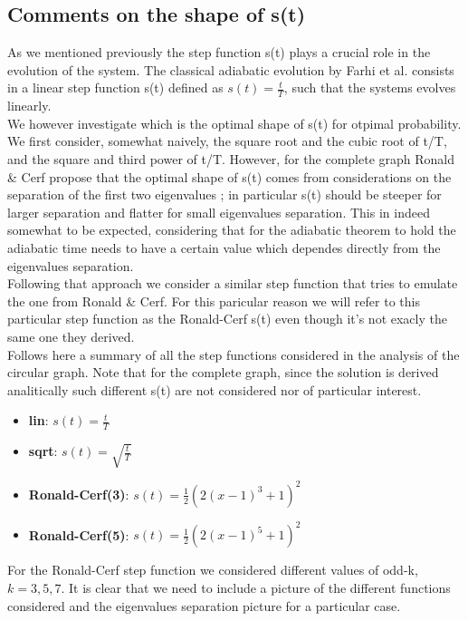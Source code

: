     \subsection{Comments on the shape of s(t)}
        As we mentioned previously the step function s(t) plays a crucial role in the evolution of the system. The classical adiabatic evolution by Farhi et al. \cite{Farhi2000} consists in a linear step function s(t) defined as $s(t) = \frac{t}{T}$, such that the systems evolves linearly. \\


        We however investigate which is the optimal shape of s(t) for otpimal probability. We first consider, somewhat naively, the square root and the cubic root of t/T, and the square and third power of t/T. However, for the complete graph Ronald \& Cerf propose that the optimal shape of s(t) comes from considerations on the separation of the first two eigenvalues \cite{Roland2002}; in particular s(t) should be steeper for larger separation and flatter for small eigenvalues separation. This in indeed somewhat to be expected, considering that for the adiabatic theorem to hold the adiabatic time needs to have a certain value which dependes directly from the eigenvalues separation. \\
        Following that approach we consider a similar step function that tries to emulate the one from Ronald \& Cerf. For this paricular reason we will refer to this particular step function as the Ronald-Cerf s(t) even though it's not exacly the same one they derived. \\


        Follows here a summary of all the step functions considered in the analysis of the circular graph. Note that for the complete graph, since the solution is derived analitically such different s(t) are not considered nor of particular interest.
          \begin{itemize}
            \item \textbf{lin}: $s(t) = \frac{t}{T}$
            \item \textbf{sqrt}: $s(t) = \sqrt{\frac{t}{T}}$
            \item \textbf{Ronald-Cerf(3)}: $s(t) = \frac{1}{2}(2(x-1)^{3}+1)^2$
            \item \textbf{Ronald-Cerf(5)}: $s(t) = \frac{1}{2}(2(x-1)^{5}+1)^2$
          \end{itemize}
        For the Ronald-Cerf step function we considered different values of odd-k, $k=3,5,7$. It is clear that we need to include a picture of the different functions considered and the eigenvalues separation picture for a particular case.

